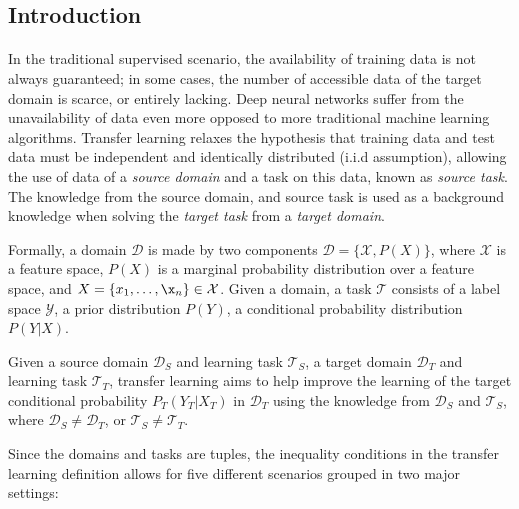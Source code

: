 \subsection{Introduction}
\paragraph{}
In the traditional supervised scenario, the availability of training data is not always guaranteed; in some cases, the number of accessible data of the target domain is scarce, or entirely lacking. Deep neural networks suffer from the unavailability of data even more opposed to more traditional machine learning algorithms. Transfer learning relaxes the hypothesis that training data and test data must be independent and identically distributed (i.i.d assumption), allowing the use of data of a \textit{source domain} and a task on this data, known as \textit{source task}. The knowledge from the source domain, and source task is used as a background knowledge when solving the \textit{target task} from a \textit{target domain}. 

Formally, a domain $\mathcal{D}$ is made by two components $\mathcal{D} = \{\mathcal{X}, P(X)\}$, where $\mathcal{X}$ is a feature space, $P(X)$ is a marginal probability distribution over a feature space, and $X = \{x_1, \dots, \x_n\} \in \mathcal{X}$. Given a domain, a task $\mathcal{T}$ 
consists of a label space $\mathcal{Y}$, a prior distribution $P(Y)$, a conditional probability distribution $P(Y|X)$. 

Given a source domain $\mathcal{D}_S$ and learning task $\mathcal{T}_S$, a target domain $\mathcal{D}_T$ and learning task $\mathcal{T}_T$, transfer learning aims to help improve the learning of the target conditional probability $P_T(Y_T|X_T)$ in $\mathcal{D}_T$ using the knowledge from $\mathcal{D}_S$ and $\mathcal{T}_S$, where $\mathcal{D}_S \neq \mathcal{D}_T$, or $\mathcal{T}_S \neq \mathcal{T}_T$.

Since the domains and tasks are tuples, the inequality conditions in the transfer learning definition allows for five different scenarios grouped in two major settings:


